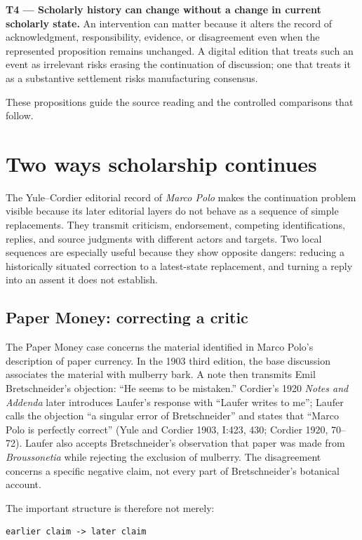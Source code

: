 \documentclass[11pt,a4paper]{article}
\begin{document}
\textbf{T4 — Scholarly history can change without a change in current scholarly state.} An intervention can matter because it alters the record of acknowledgment, responsibility, evidence, or disagreement even when the represented proposition remains unchanged. A digital edition that treats such an event as irrelevant risks erasing the continuation of discussion; one that treats it as a substantive settlement risks manufacturing consensus.


These propositions guide the source reading and the controlled comparisons that follow.


\section{Two ways scholarship continues}

The Yule–Cordier editorial record of \emph{Marco Polo} makes the continuation problem visible because its later editorial layers do not behave as a sequence of simple replacements. They transmit criticism, endorsement, competing identifications, replies, and source judgments with different actors and targets. Two local sequences are especially useful because they show opposite dangers: reducing a historically situated correction to a latest-state replacement, and turning a reply into an assent it does not establish.


\subsection{Paper Money: correcting a critic}

The Paper Money case concerns the material identified in Marco Polo's description of paper currency. In the 1903 third edition, the base discussion associates the material with mulberry bark. A note then transmits Emil Bretschneider's objection: “He seems to be mistaken.” Cordier's 1920 \emph{Notes and Addenda} later introduces Laufer's response with “Laufer writes to me”; Laufer calls the objection “a singular error of Bretschneider” and states that “Marco Polo is perfectly correct” (Yule and Cordier 1903, I:423, 430; Cordier 1920, 70–72). Laufer also accepts Bretschneider's observation that paper was made from \emph{Broussonetia} while rejecting the exclusion of mulberry. The disagreement concerns a specific negative claim, not every part of Bretschneider's botanical account.


The important structure is therefore not merely:


\begin{verbatim}
earlier claim -> later claim
\end{verbatim}
\end{document}

